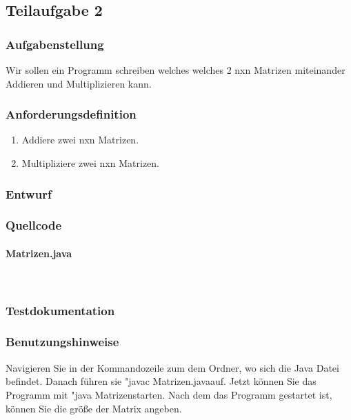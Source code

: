 \subsection{Teilaufgabe 2}
\subsubsection{Aufgabenstellung}
Wir sollen ein Programm schreiben welches welches 2 nxn Matrizen miteinander Addieren und Multiplizieren kann.

\subsubsection{Anforderungsdefinition}
\begin{enumerate}
	\item Addiere zwei nxn Matrizen.
	\item Multipliziere zwei nxn Matrizen.
\end{enumerate}

\subsubsection{Entwurf}

\subsubsection{Quellcode}
\paragraph{Matrizen.java}\


\subsubsection{Testdokumentation}

\subsubsection{Benutzungshinweise}
Navigieren Sie in der Kommandozeile zum dem Ordner, wo sich die Java Datei befindet.
Danach führen sie "javac Matrizen.java\dq \space auf. Jetzt können Sie das Programm mit
"java Matrizen\dq \space starten. Nach dem das Programm gestartet ist, können Sie die
grö\ss e der Matrix angeben.

